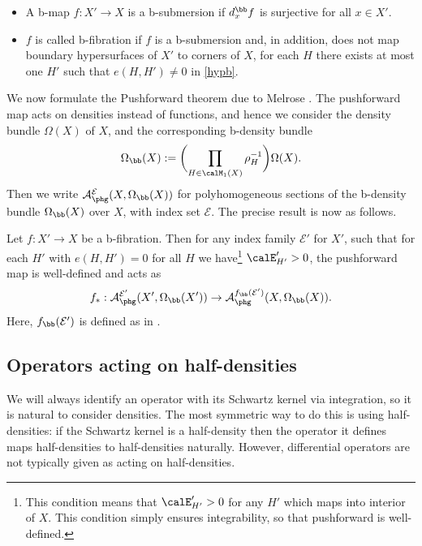 \skpt
\begin{defn}\label{b-fib}
\begin{itemize}
\item A b-map $f: X' \to X$ is a b-submersion if $d_{x}^{\bb}f$ is surjective
for all $x \in X'$.
\item $f$ is called b-fibration if $f$ is a b-submersion and, in addition,
does not map boundary hypersurfaces of $X'$ to
corners of $X$, \ie for each $H$ there exists
at most one $H'$ such that $e(H,H') \neq 0$ in \eqref{hypb}.
\end{itemize}
\end{defn}

We now formulate the Pushforward theorem due to Melrose \cite{melrose1993atiyah}.
The pushforward map acts on densities instead of functions, and hence we consider the
density bundle $\Omega(X)$ of $X$, and the corresponding b-density
bundle
\begin{equation}
\label{eqn:def omega b}
\Omega_\bb(X) := \biggl(\prod\limits_{H\in\calM_1(X)} \rho_H^{-1}\biggr) \Omega(X).
\end{equation}
Then we write $\mathcal{A}_{\phg}^{\mathcal{E}}(X, \Omega_\bb(X))$ for polyhomogeneous
sections of the b-density bundle $\Omega_\bb(X)$ over $X$, with index set $\mathcal{E}$.
The precise result is now as follows.

\begin{Prop} \label{pushforward}
Let $f : X' \to X$ be a b-fibration.
Then for any index family $\mathcal{E}'$
for $X'$, such that for each
$H'$ with $e(H,H') = 0$ for all $H$ we have\footnote{This condition means that $\calE'_{H'}> 0$ for
any $H'$ which maps into interior of $X$. This condition simply ensures
integrability, so that pushforward is well-defined.} $\calE'_{H'} > 0$,
the pushforward map is well-defined and acts as
\[
f_{*}: \mathcal{A}_{\phg}^{\mathcal{E}'}(X',\Omega_\bb(X'))
\to \mathcal{A}_{\phg}^{f_\bb
(\mathcal{E}')}(X,\Omega_\bb(X)).
\]
Here, $f_\bb(\mathcal{E}')$ is defined as in \cite[A.15]{mazzeorafe1991elliptic}.
\end{Prop}

\subsection{Operators acting on half-densities} \label{subsec:half densities}
We will always identify an operator with its Schwartz kernel via integration, so
it is natural to consider densities. The most symmetric way to do this is
using half-densities: if the Schwartz kernel is a half-density then the operator
it defines maps half-densities to half-densities naturally. However, differential operators are
not typically given as acting on half-densities.

